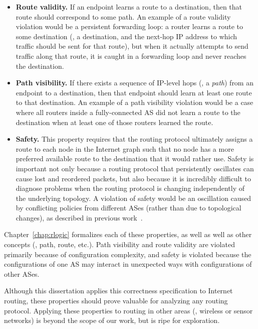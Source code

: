 \begin{itemize}
\item {\bf Route validity.}  If an endpoint learns a route to a
  destination, then that route should correspond to some path.  An
  example of a route validity violation would be a persistent forwarding
  loop: a router learns a route to some destination (\ie, a destination,
  and the next-hop IP address to which traffic should be sent for that
  route), but when it actually attempts to send traffic along that
  route, it is caught in a forwarding loop and never reaches
  the destination.

\item {\bf Path visibility.}  If there exists a sequence of IP-level
  hops (\ie, a {\em path}) from an endpoint to a destination, then
  that endpoint should learn at least one route to that destination.  An
  example of a path visibility violation would be a case where all
  routers inside a fully-connected AS did not learn a route to the
  destination when at least one of those routers learned the route.  

\item {\bf Safety.}  This property requires that the
  routing protocol ultimately assigns a route to each node in the
  Internet graph 
  such that no node has a more preferred available route to the
  destination that it would rather use.  Safety is important not only
  because a routing protocol that persistently oscillates can cause lost
  and reordered packets, but also because it is incredibly difficult to
  diagnose problems when the routing protocol is changing independently
  of the underlying topology.  A violation of safety would be an
  oscillation caused by conflicting policies from different ASes (rather
  than due to topological changes), as described in previous
  work~\cite{Griffin2002c, Varadhan1996}.
\end{itemize}

Chapter~\ref{chap:rlogic} formalizes each of these
properties, as well as well as other concepts (\eg, path,
route, etc.).  Path visibility and route validity are violated primarily
because of configuration complexity, and safety is violated because the
configurations of one AS may interact in unexpected ways with
configurations of other ASes.

Although this dissertation applies this correctness specification to
Internet routing, these properties should prove valuable for analyzing
any routing protocol.  Applying these properties to routing in other
areas (\eg, wireless or sensor networks) is beyond the scope of our
work, but is ripe for exploration.

